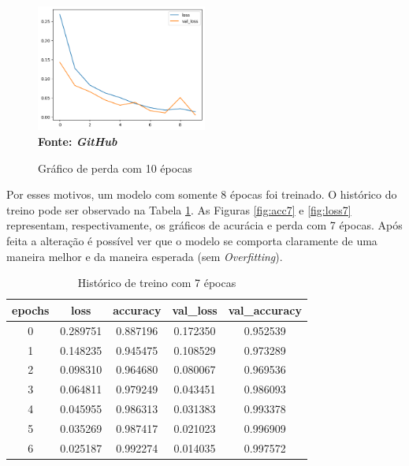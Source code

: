 \begin{figure}[ht]
 	\centering	
 	\caption[\hspace{0.1cm}Grade Computacional.]{Gráfico de perda com 10 épocas}
 	\vspace{-0.4cm}
 	\includegraphics[width=0.5\textwidth]{figuras/loss_10.png}
 	\captionsetup{justification=centering}
	\vspace{-0.2cm}
     \\\textbf{\footnotesize Fonte: \textit{GitHub}}
	\label{fig:loss10}
\end{figure}


Por esses motivos, um modelo com somente 8 épocas foi treinado. O histórico do treino pode ser observado na Tabela \ref{tab:history7}. As Figuras \ref{fig:acc7} e \ref{fig:loss7} representam, respectivamente, os gráficos de acurácia e perda com 7 épocas. Após feita a alteração é possível ver que o modelo se comporta claramente de uma maneira melhor e da maneira esperada (sem \textit{Overfitting}).


\begin{table}[h]
  \centering
  \caption{Histórico de treino com 7 épocas}
   \label{tab:history7}
\begin{tabular}{|c|c|c|c|c|} 
  \hline
   epochs & loss & accuracy & val\_loss & val\_accuracy \\
  \hline
0 & 0.289751 & 0.887196 & 0.172350 & 0.952539 \\
1 & 0.148235 & 0.945475 & 0.108529 & 0.973289 \\
2 & 0.098310 & 0.964680 & 0.080067 & 0.969536 \\
3 & 0.064811 & 0.979249 & 0.043451 & 0.986093 \\
4 & 0.045955 & 0.986313 & 0.031383 & 0.993378 \\
5 & 0.035269 & 0.987417 & 0.021023 & 0.996909 \\
6 & 0.025187 & 0.992274 & 0.014035 & 0.997572 \\
  \hline
\end{tabular}

\end{table}

